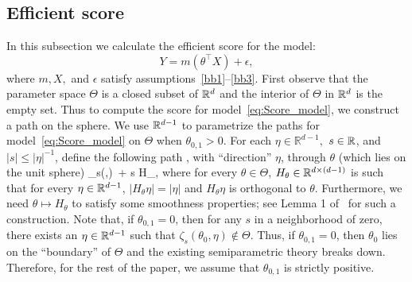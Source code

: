 {\subsection{Efficient score}\label{sec:eff_score}
In this subsection we  calculate the efficient score for the model:
\begin{equation}\label{eq:Score_model}
Y=m(\theta^\top X)+\epsilon,
\end{equation}
where $m, X,$ and $\epsilon$ satisfy assumptions~\ref{bb1}--\ref{bb3}.  First observe that the parameter space $\Theta$ is a closed subset of $\mathbb{R}^d$ and the interior of $\Theta$  in $\mathbb{R}^d$ is the empty set. Thus to compute the score for model~\eqref{eq:Score_model}, we construct a path on the sphere. We use $\mathbb{R}^{d-1}$ to parametrize the paths for model~\eqref{eq:Score_model} on $\Theta$ when $\theta_{0,1} >0$. For each $\eta\in\mathbb{R}^{d-1}, $ $s \in \mathbb{R}$, and $|s| \le |\eta|^{-1}$,  define the following path , with ``direction'' $\eta$, through $\theta$ (which lies on the unit sphere)
\be\label{eq:path_para}
\zeta_s(\theta,\eta)\coloneqq{}\, \theta + s H_\theta \eta,
\ee
 where for every $\theta\in \Theta$, $H_\theta \in \mathbb{R}^{d\times(d-1)}$ is such that for every $\eta \in \mathbb{R}^{d-1}$,  $| H_\theta \eta| =|\eta|$ and $H_\theta\eta$ is orthogonal to $\theta$. Furthermore, we need $\theta \mapsto H_\theta$ to satisfy some smoothness properties; see Lemma 1 of~\cite{Patra16} for such a construction. {Note that, if $\theta_{0,1}=0$, then for any $s$ in a neighborhood of zero, there exists an $\eta\in \mathbb{R}^{d-1}$ such that  $\zeta_s(\theta_0,\eta) \notin \Theta$. Thus, if $\theta_{0,1}=0$, then $\theta_0$ lies on the ``boundary'' of $\Theta$ and the existing semiparametric theory breaks down. Therefore, for the rest of the paper, we assume that $\theta_{0,1}$ is strictly positive.}

}
